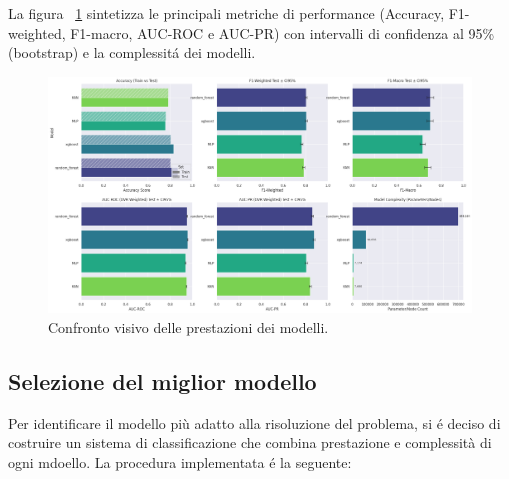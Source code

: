 \documentclass[a4paper,12pt]{report}
\begin{document}
	La figura ~\ref{fig:comparison_pm} sintetizza le principali metriche di performance (Accuracy, F1-weighted, F1-macro, AUC-ROC e AUC-PR) con intervalli di confidenza al 95\% (bootstrap) e la complessitá dei modelli.
	
	\begin{figure}[H]
		\centering
		\includegraphics[width=1.0\textwidth]{img/comparison_pm.png}
		\caption{Confronto visivo delle prestazioni dei modelli.}
		\label{fig:comparison_pm}
	\end{figure}
	
	\subsection{Selezione del miglior modello}
	Per identificare il modello più adatto alla risoluzione del problema, si é deciso di costruire un sistema di classificazione che combina prestazione e complessità di ogni mdoello. La procedura implementata é la seguente:
	
\end{document}
